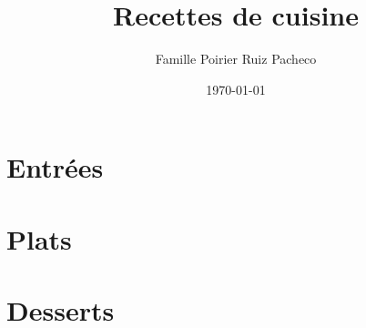 \documentclass{livrerecettes}
\begin{document}
\title{Recettes de cuisine}
\author{Famille Poirier Ruiz Pacheco}
\date{\today}
\maketitle

\tableofcontents

\chapter{Entrées}
\newpage



\chapter{Plats}
\newpage

\newpage


\chapter{Desserts}
\newpage


\end{document}
